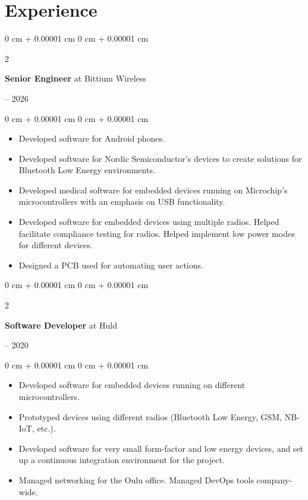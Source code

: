 \documentclass{article}
\newenvironment{highlights}{
    \begin{itemize}[
        topsep=0.10 cm,
        parsep=0.10 cm,
        partopsep=0pt,
        itemsep=0pt,
        leftmargin=0 cm + 10pt
    ]
}{
    \end{itemize}
}
\newenvironment{onecolentry}{
    \begin{adjustwidth}{
        0 cm + 0.00001 cm
    }{
        0 cm + 0.00001 cm
    }
}{
    \end{adjustwidth}
}
\newenvironment{twocolentry}[2][]{
    \onecolentry
    \def\secondColumn{#2}
    \setcolumnwidth{\fill, 4.5 cm}
    \begin{paracol}{2}
}{
    \switchcolumn \raggedleft \secondColumn
    \end{paracol}
    \endonecolentry
}
\begin{document}
  \section{Experience}
    \begin{twocolentry}{2020 -- 2026}
      \textbf{Senior Engineer} at Bittium Wireless
    \end{twocolentry}
    \vspace{0.1 cm}
    \begin{onecolentry}
      \begin{highlights}
        \item Developed software for Android phones.
        \item Developed software for Nordic Semiconductor's devices to create solutions for Bluetooth Low Energy environments.
        \item Developed medical software for embedded devices running on Microchip's microcontrollers with an emphasis on USB functionality.
        \item Developed software for embedded devices using multiple radios. Helped facilitate compliance testing for radios. Helped implement low power modes for different devices.
        \item Designed a PCB used for automating user actions.
      \end{highlights}
    \end{onecolentry}
    \vspace{0.3 cm}
    \begin{twocolentry}{2017 -- 2020}
      \textbf{Software Developer} at Huld
    \end{twocolentry}
    \vspace{0.1 cm}
    \begin{onecolentry}
      \begin{highlights}
        \item Developed software for embedded devices running on different microcontrollers.
        \item Prototyped devices using different radios (Bluetooth Low Energy, GSM, NB-IoT, etc.).
        \item Developed software for very small form-factor and low energy devices, and set up a continuous integration environment for the project.
        \item Managed networking for the Oulu office. Managed DevOps tools company-wide.
      \end{highlights}
    \end{onecolentry}
\end{document}
